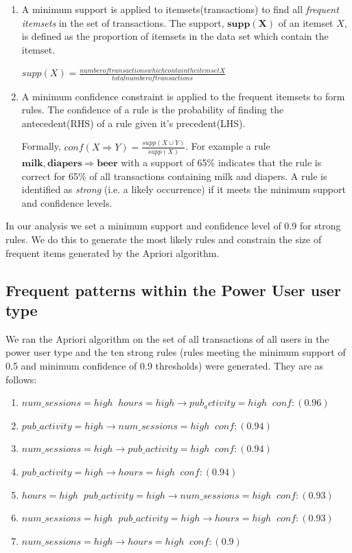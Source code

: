 \documentclass{acm_proc_article-sp}
\begin{document}
\begin{enumerate}
\item A minimum support is applied to itemsets(transactions) to find all \textit{frequent itemsets} in the set of transactions.
The support, $\mathbf{supp(X)}$ of an itemset $X$, is defined as the proportion of itemsets in the data set which contain the 
itemset.



$supp\left(X\right) = \frac{number of transactions which contain the itemset X}{total number of transactions}$



\item A minimum confidence constraint is applied to the frequent itemsets to form rules. The confidence of a rule is the probability of finding the antecedent(RHS) of a rule given it's precedent(LHS).

Formally, $conf(X \Longrightarrow Y) = \frac{supp\left(X \cup Y\right)}{supp\left(X\right)}$. 
For example a rule $\mathbf{milk,diapers \Longrightarrow {beer}}$ with a support of 65\% indicates that the rule is correct for 65\% of all transactions containing milk and diapers.
 A rule is identified as \textit{strong} (i.e. a likely occurrence) if it meets the minimum support and confidence levels.
\end{enumerate}

In our analysis we set a minimum support and confidence level of 0.9 for strong rules. We do this to generate the most likely rules and constrain the size of frequent items generated by the Apriori algorithm.

\subsection {Frequent patterns within the Power User user type}
We ran the Apriori algorithm on the set of all transactions of all users in the power user type and the ten strong rules (rules meeting the minimum support of 0.5 and minimum confidence of 0.9 thresholds) were generated. They are as follows:

\begin{enumerate}
 \item $num\_sessions=high \;\; hours=high \longrightarrow pub_activity=high   \;\;conf:(0.96)$
 \item $pub\_activity=high \longrightarrow num\_sessions=high  \;\;  conf:(0.94)$
 \item $num\_sessions=high \longrightarrow pub\_activity=high   \;\; conf:(0.94)$
 \item $pub\_activity=high \longrightarrow hours=high  \;\;  conf:(0.94)$
 \item $hours=high \;\; pub\_activity=high \longrightarrow num\_sessions=high  \;\; conf:(0.93)$
 \item $num\_sessions=high \;\; pub\_activity=high \longrightarrow hours=high   \;\;conf:(0.93)$
 \item $num\_sessions=high  \longrightarrow hours=high \;\;  conf:(0.9)$
\end{enumerate}
\end{document}
